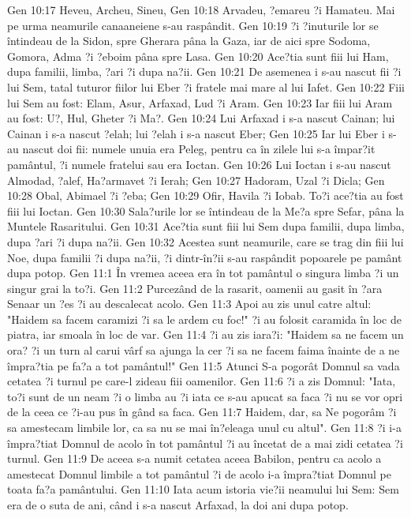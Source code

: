 Gen 10:17  Heveu, Archeu, Sineu,
Gen 10:18  Arvadeu, ?emareu ?i Hamateu. Mai pe urma neamurile canaaneiene s-au raspândit.
Gen 10:19  ?i ?inuturile lor se întindeau de la Sidon, spre Gherara pâna la Gaza, iar de aici spre Sodoma, Gomora, Adma ?i ?eboim pâna spre Lasa.
Gen 10:20  Ace?tia sunt fiii lui Ham, dupa familii, limba, ?ari ?i dupa na?ii.
Gen 10:21  De asemenea i s-au nascut fii ?i lui Sem, tatal tuturor fiilor lui Eber ?i fratele mai mare al lui Iafet.
Gen 10:22  Fiii lui Sem au fost: Elam, Asur, Arfaxad, Lud ?i Aram.
Gen 10:23  Iar fiii lui Aram au fost: U?, Hul, Gheter ?i Ma?.
Gen 10:24  Lui Arfaxad i s-a nascut Cainan; lui Cainan i s-a nascut ?elah; lui ?elah i s-a nascut Eber;
Gen 10:25  Iar lui Eber i s-au nascut doi fii: numele unuia era Peleg, pentru ca în zilele lui s-a împar?it pamântul, ?i numele fratelui sau era Ioctan.
Gen 10:26  Lui Ioctan i s-au nascut Almodad, ?alef, Ha?armavet ?i Ierah;
Gen 10:27  Hadoram, Uzal ?i Dicla;
Gen 10:28  Obal, Abimael ?i ?eba;
Gen 10:29  Ofir, Havila ?i Iobab. To?i ace?tia au fost fiii lui Ioctan.
Gen 10:30  Sala?urile lor se întindeau de la Me?a spre Sefar, pâna la Muntele Rasaritului.
Gen 10:31  Ace?tia sunt fiii lui Sem dupa familii, dupa limba, dupa ?ari ?i dupa na?ii.
Gen 10:32  Acestea sunt neamurile, care se trag din fiii lui Noe, dupa familii ?i dupa na?ii, ?i dintr-în?ii s-au raspândit popoarele pe pamânt dupa potop.
Gen 11:1  În vremea aceea era în tot pamântul o singura limba ?i un singur grai la to?i.
Gen 11:2  Purcezând de la rasarit, oamenii au gasit în ?ara Senaar un ?es ?i au descalecat acolo.
Gen 11:3  Apoi au zis unul catre altul: "Haidem sa facem caramizi ?i sa le ardem cu foc!" ?i au folosit caramida în loc de piatra, iar smoala în loc de var.
Gen 11:4  ?i au zis iara?i: "Haidem sa ne facem un ora? ?i un turn al carui vârf sa ajunga la cer ?i sa ne facem faima înainte de a ne împra?tia pe fa?a a tot pamântul!"
Gen 11:5  Atunci S-a pogorât Domnul sa vada cetatea ?i turnul pe care-l zideau fiii oamenilor.
Gen 11:6  ?i a zis Domnul: "Iata, to?i sunt de un neam ?i o limba au ?i iata ce s-au apucat sa faca ?i nu se vor opri de la ceea ce ?i-au pus în gând sa faca.
Gen 11:7  Haidem, dar, sa Ne pogorâm ?i sa amestecam limbile lor, ca sa nu se mai în?eleaga unul cu altul".
Gen 11:8  ?i i-a împra?tiat Domnul de acolo în tot pamântul ?i au încetat de a mai zidi cetatea ?i turnul.
Gen 11:9  De aceea s-a numit cetatea aceea Babilon, pentru ca acolo a amestecat Domnul limbile a tot pamântul ?i de acolo i-a împra?tiat Domnul pe toata fa?a pamântului.
Gen 11:10  Iata acum istoria vie?ii neamului lui Sem: Sem era de o suta de ani, când i s-a nascut Arfaxad, la doi ani dupa potop.
